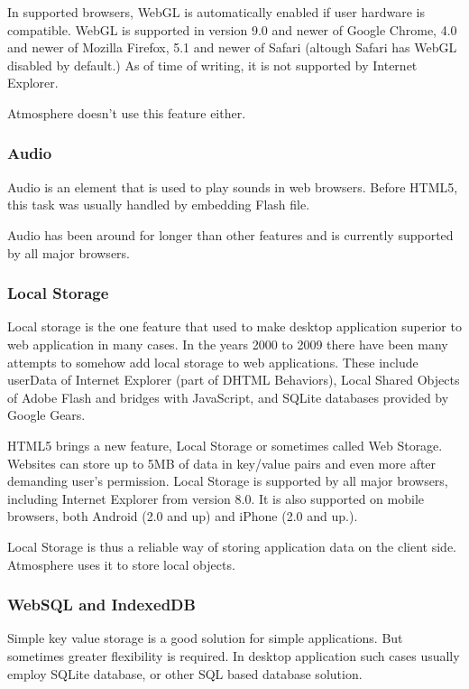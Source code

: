 In supported browsers, WebGL is automatically enabled if user hardware is compatible. WebGL is  supported in version 9.0 and newer of Google Chrome, 4.0 and newer of Mozilla Firefox, 5.1 and newer of Safari (altough Safari has WebGL disabled by default.) As of time of writing, it is not supported by Internet Explorer. 

Atmosphere doesn’t use this feature either.

\subsubsection{Audio}

Audio is an element that is used to play sounds in web browsers. Before HTML5, this task was usually handled by embedding Flash file. 

Audio has been around for longer than other features and is currently supported by all major browsers.

\subsubsection{Local Storage}

Local storage is the one feature that used to make desktop application superior to web application in many cases. In the years 2000 to 2009 there have been many attempts to somehow add local storage to web applications. These include userData of Internet Explorer (part of DHTML Behaviors), Local Shared Objects of Adobe Flash and bridges with JavaScript, and SQLite databases provided by Google Gears.

HTML5 brings a new feature, Local Storage or sometimes called Web Storage. Websites can store up to 5MB of data in key/value pairs and even more after demanding user’s permission. Local Storage is supported by all major browsers, including Internet Explorer from version 8.0. It is also supported on mobile browsers, both Android (2.0 and up) and iPhone (2.0 and up.). 

Local Storage is thus a reliable way of storing application data on the client side. Atmosphere uses it to store local objects. 

\subsubsection{WebSQL and IndexedDB}

Simple key value storage is a good solution for simple applications. But sometimes greater flexibility is required. In desktop application such cases usually employ SQLite database, or other SQL based database solution. 

